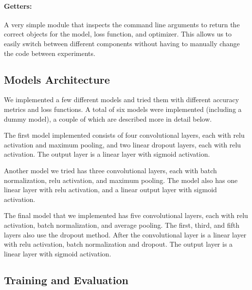 \documentclass[a4paper, 12pt]{article}
\begin{document}
\paragraph{Getters:}
A very simple module that inspects the command line arguments to return the correct objects for the model, loss function, and optimizer. This allows us to easily switch between different components without having to manually change the code between experiments.

\subsection{Models Architecture}

We implemented a few different models and tried them with different accuracy metrics and loss functions. A total of six models were implemented (including a dummy model), a couple of which are described more in detail below.

The first model implemented consists of four convolutional layers, each with relu activation and maximum pooling, and two linear dropout layers, each with relu activation. The output layer is a linear layer with sigmoid activation.

Another model we tried has three convolutional layers, each with batch normalization, relu activation, and maximum pooling. The model also has one linear layer with relu activation, and a linear output layer with sigmoid activation.

The final model that we implemented has five convolutional layers, each with relu activation, batch normalization, and average pooling. The first, third, and fifth layers also use the dropout method. After the convolutional layer is a linear layer with relu activation, batch normalization and dropout. The output layer is a linear layer with sigmoid activation.

\subsection{Training and Evaluation}
\end{document}
